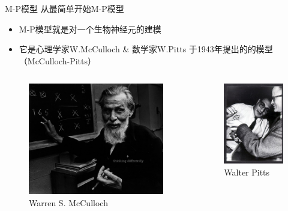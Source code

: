 \documentclass[xcolor=svgnames]{beamer}
\begin{document}
\begin{frame}{M-P模型}
  从最简单开始\pozhehao M-P模型
  \begin{itemize}
  \item M-P模型就是\alert{对一个生物神经元的建模}
  \item 它是心理学家W.McCulloch \& 数学家W.Pitts 于1943年提出的的模型
    （\alert{McCulloch-Pitts}）
  \end{itemize}
  \begin{columns}
    \begin{figure}
      \centering
      \includegraphics[height=.5\textheight]{fig22.jpg}
      \caption{Warren S. McCulloch}
      \label{fig:mcculloch}
    \end{figure}
    \begin{figure}
      \centering
      \includegraphics[height=.5\textheight]{fig23.jpg}
      \caption{Walter Pitts}
      \label{fig:mcculloch}
    \end{figure}
  \end{columns}
\end{frame}
\end{document}

